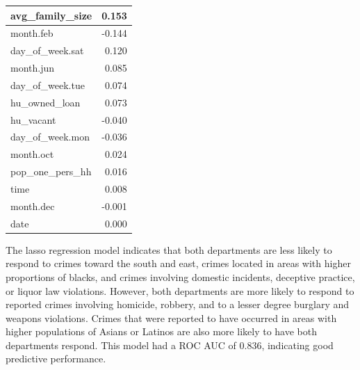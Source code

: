 \documentclass{ucetd}
\begin{document}
\begin{table}
\begin{tabular}[t]{l|r}
\hline
avg\_family\_size & 0.153\\
\hline
month.feb & -0.144\\
\hline
day\_of\_week.sat & 0.120\\
\hline
month.jun & 0.085\\
\hline
day\_of\_week.tue & 0.074\\
\hline
hu\_owned\_loan & 0.073\\
\hline
hu\_vacant & -0.040\\
\hline
day\_of\_week.mon & -0.036\\
\hline
month.oct & 0.024\\
\hline
pop\_one\_pers\_hh & 0.016\\
\hline
time & 0.008\\
\hline
month.dec & -0.001\\
\hline
date & 0.000\\
\hline
\end{tabular}
\end{table}

The lasso regression model indicates that both departments are less
likely to respond to crimes toward the south and east, crimes located in
areas with higher proportions of blacks, and crimes involving domestic
incidents, deceptive practice, or liquor law violations. However, both
departments are more likely to respond to reported crimes involving
homicide, robbery, and to a lesser degree burglary and weapons
violations. Crimes that were reported to have occurred in areas with
higher populations of Asians or Latinos are also more likely to have
both departments respond. This model had a ROC AUC of 0.836, indicating
good predictive performance.
\end{document}
